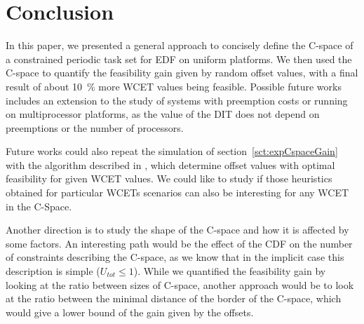 \documentclass[conference]{IEEEtran}
\begin{document}
\section{Conclusion}

In this paper, we presented a general approach to concisely define the C-space of a constrained periodic task set for EDF on uniform platforms. We then used the C-space to quantify the feasibility gain given by random offset values, with a final result of about 10~\% more WCET values being feasible. Possible future works includes an extension to the study of systems with preemption costs or running on multiprocessor platforms, as the value of the DIT does not depend on preemptions or the number of processors.

Future works could also repeat the simulation of section~\ref{sct:expCspaceGain} with the algorithm described in \cite{grenier2008pushing}, which determine offset values with optimal feasibility for given WCET values. We could like to study if those heuristics obtained for particular WCETs scenarios can also be interesting for any WCET in the \mbox{C-Space}.


Another direction is to study the shape of the C-space and how it is affected by some factors. An
interesting path would be the effect of the CDF on the number of constraints describing the C-space,
as we know that in the implicit case this description is simple ($U_{tot} \leqslant 1$). While we
quantified the feasibility gain by looking at the ratio between sizes of C-space, another approach
would be to look at the ratio between the minimal distance of the border of the C-space, which would
give a lower bound of the gain given by the offsets.







\end{document}
